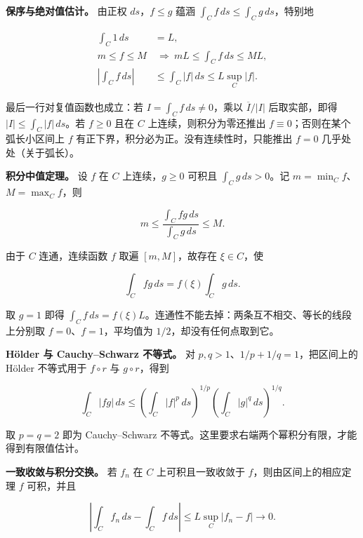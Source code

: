 \documentclass[11pt,a4paper]{article}
\begin{document}
\textbf{保序与绝对值估计。} 由正权 \(ds\)，\(f\le g\) 蕴涵
\(\int_C f\,ds\le\int_Cg\,ds\)，特别地

\begin{equation}
\begin{aligned}
\int_C1\,ds&=L,\\
m\le f\le M&\ \Longrightarrow\ mL\le\int_Cf\,ds\le ML,\\
\left|\int_Cf\,ds\right|&\le\int_C|f|\,ds
\le L\sup_C|f|.
\end{aligned}
\tag{3}
\end{equation}

最后一行对复值函数也成立：若 \(I=\int_Cf\,ds\ne0\)，乘以
\(\overline I/|I|\) 后取实部，即得 \(|I|\le\int_C|f|\,ds\)。若 \(f\ge0\)
且在 \(C\) 上连续，则积分为零还推出 \(f\equiv0\)；否则在某个弧长小区间上
\(f\) 有正下界，积分必为正。没有连续性时，只能推出 \(f=0\)
几乎处处（关于弧长）。

\textbf{积分中值定理。} 设 \(f\) 在 \(C\) 上连续，\(g\ge0\) 可积且
\(\int_Cg\,ds>0\)。记 \(m=\min_C f\)、\(M=\max_Cf\)，则

\begin{equation}
m\le\frac{\int_Cfg\,ds}{\int_Cg\,ds}\le M.
\tag{4}
\end{equation}

由于 \(C\) 连通，连续函数 \(f\) 取遍 \([m,M]\)，故存在 \(\xi\in C\)，使

\begin{equation}
\int_Cfg\,ds=f(\xi)\int_Cg\,ds.
\tag{5}
\end{equation}

取 \(g=1\) 即得
\(\int_Cf\,ds=f(\xi)L\)。连通性不能去掉：两条互不相交、等长的线段上分别取
\(f=0\)、\(f=1\)，平均值为 \(1/2\)，却没有任何点取到它。

\textbf{Hölder 与 Cauchy--Schwarz 不等式。} 对
\(p,q>1\)、\(1/p+1/q=1\)，把区间上的 Hölder 不等式用于 \(f\circ r\) 与
\(g\circ r\)，得到

\begin{equation}
\int_C|fg|\,ds\le
\left(\int_C|f|^p\,ds\right)^{1/p}
\left(\int_C|g|^q\,ds\right)^{1/q}.
\tag{6}
\end{equation}

取 \(p=q=2\) 即为 Cauchy--Schwarz
不等式。这里要求右端两个幂积分有限，才能得到有限值估计。

\textbf{一致收敛与积分交换。} 若 \(f_n\) 在 \(C\) 上可积且一致收敛于
\(f\)，则由区间上的相应定理 \(f\) 可积，并且

\begin{equation}
\left|\int_Cf_n\,ds-\int_Cf\,ds\right|
\le L\sup_C|f_n-f|\longrightarrow0.
\tag{7}
\end{equation}
\end{document}
